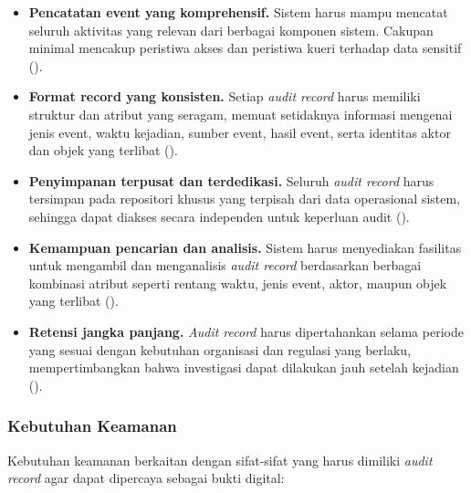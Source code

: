 \begin{itemize}
    \item \textbf{Pencatatan event yang komprehensif.} Sistem harus
    mampu mencatat seluruh aktivitas yang relevan dari berbagai
    komponen sistem. Cakupan minimal mencakup peristiwa akses dan
    peristiwa kueri terhadap data sensitif (\cite{iso27789_2021}).

    \item \textbf{Format record yang konsisten.} Setiap
    \textit{audit record} harus memiliki struktur dan atribut yang
    seragam, memuat setidaknya informasi mengenai jenis event, waktu
    kejadian, sumber event, hasil event, serta identitas aktor dan
    objek yang terlibat (\cite{iso27789_2021}).

    \item \textbf{Penyimpanan terpusat dan terdedikasi.} Seluruh
    \textit{audit record} harus tersimpan pada repositori khusus yang
    terpisah dari data operasional sistem, sehingga dapat diakses
    secara independen untuk keperluan audit (\cite{iso27789_2021}).

    \item \textbf{Kemampuan pencarian dan analisis.} Sistem harus
    menyediakan fasilitas untuk mengambil dan menganalisis
    \textit{audit record} berdasarkan berbagai kombinasi atribut
    seperti rentang waktu, jenis event, aktor, maupun objek yang
    terlibat (\cite{iso27789_2021}).

    \item \textbf{Retensi jangka panjang.} \textit{Audit record} harus
    dipertahankan selama periode yang sesuai dengan kebutuhan
    organisasi dan regulasi yang berlaku, mempertimbangkan bahwa
    investigasi dapat dilakukan jauh setelah kejadian
    (\cite{iso27789_2021}).
\end{itemize}

\subsubsection{Kebutuhan Keamanan}

Kebutuhan keamanan berkaitan dengan sifat-sifat yang harus dimiliki
\textit{audit record} agar dapat dipercaya sebagai bukti digital:

